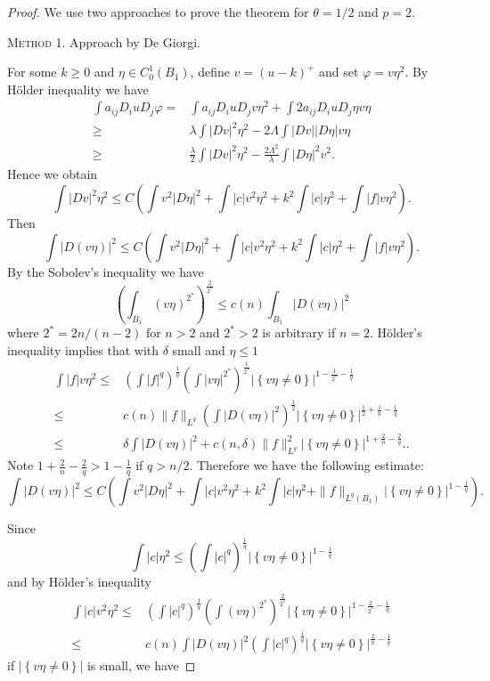 \begin{proof}
  We use two approaches to prove the theorem for $\theta=1/2$ and $p=2$.

\textsc{Method 1.} Approach by De Giorgi.

For some $k\ge 0$ and $\eta\in C_0^1(B_1)$, define $v=(u-k)^+$ and set $\varphi = v\eta^2$. By H\"{o}lder inequality we have
\begin{align*}
  \int a_{ij}D_i u D_j\varphi=& \int a_{ij}D_i u D_j v\eta^2+\int 2a_{ij}D_i u D_j\eta v\eta\\
  \ge & \lambda \int |Dv|^2\eta^2-2\Lambda \int |Dv| |D\eta|v\eta \\
  \ge & \frac{\lambda}{2}\int |Dv|^2\eta^2- \frac{2\Lambda^2}{\lambda}\int |D\eta|^2v^2.
\end{align*} 
Hence we obtain 
$$
  \int |Dv|^2\eta^2 \le C\left(\int v^2|D\eta|^2+\int |c|v^2\eta^2+k^2\int|c|\eta^2+\int |f|v\eta^2\right).
$$
Then 
$$
  \int |D(v\eta)|^2\le C \left( \int v^2|D\eta|^2+ \int |c|v^2\eta^2+k^2\int|c|\eta^2+\int |f|v\eta^2\right).
$$
By the Sobolev's inequality we have
$$
  \left(\int_{B_1}(v\eta)^{2^*}\right)^{\frac{2}{2^*}}\le c(n)\int _{B_1}|D(v\eta)|^2
$$
where $2^*=2n/(n-2)$ for $n>2$ and $2^*>2$ is arbitrary if $n=2$. H\"{o}lder's inequality implies that  with $\delta$ small and $\eta\le 1$ 
\begin{align*}
  \int |f|v\eta^2\le& \left( \int |f|^q \right) ^{\frac{1}{q}}\left( \int |v\eta|^{2^*} \right) ^{\frac{1}{2^*}} |\left\{v\eta\neq 0\right\} |^{1-\frac{1}{2^*}-\frac{1}{q}}\\
  \le & c(n)\|f\|_{L^{q}}\left( \int |D(v\eta)|^2 \right) ^{\frac{1}{2}}|\left\{v\eta\neq 0\right\} |^{\frac{1}{2}+\frac{1}{n}-\frac{1}{q}}\\
  \le & \delta \int|D\left( v\eta \right) |^2+c(n,\delta)\|f\|^2_{L^{q}} |\left\{v\eta\neq 0\right\} |^{1+\frac{2}{n}-\frac{2}{q}}.
.\end{align*}
Note $1+\frac{2}{n}-\frac{2}{q}>1-\frac{1}{q}$ if $q>n /2$. Therefore we have the following estimate:
\[
  \int |D(v\eta)|^2\le C \left( \int v^2|D\eta|^2+\int|c|v^2\eta^2+k^2\int |c|\eta^2+\|f\|_{L^{q}(B_1)}|\left\{v\eta\neq 0\right\} |^{1-\frac{1}{q}} \right) .
\] 

Since 
\[
  \int |c|\eta^2\le \left( \int|c|^{q} \right) ^{\frac{1}{q}}|\left\{v\eta\neq 0\right\} |^{1-\frac{1}{q}}
\] 
and by H\"{o}lder's inequality
\begin{align*}
  \int |c|v^2\eta^2\le & \left( \int|c|^{q} \right) ^{\frac{1}{q}}\left( \int (v\eta)^{2^*} \right) ^{\frac{2}{2^*}}|\left\{v\eta\neq 0\right\} |^{1-\frac{2}{2^*}-\frac{1}{q}}\\
  \le & c(n) \int |D(v\eta)|^2\left( \int |c|^{q} \right) ^{\frac{1}{q}}|\left\{v\eta\neq 0\right\} |^{\frac{2}{n}-\frac{1}{q}}
\end{align*}
if  $|\left\{v\eta\neq 0\right\}| $ is small, we have


\end{proof}
